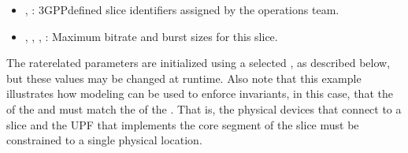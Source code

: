 \documentclass[a4paper,11pt,english]{sphinxmanual}
\begin{document}
\begin{itemize}
\item {} 
\sphinxAtStartPar
{}, : 3GPP\sphinxhyphen{}defined slice identifiers assigned by the operations team.

\item {} 
\sphinxAtStartPar
{}, , ,
: Maximum bit\sphinxhyphen{}rate and burst sizes for
this slice.

\end{itemize}

\sphinxAtStartPar
The rate\sphinxhyphen{}related parameters are initialized using a selected
, as described below, but these values may be changed at
runtime. Also note that this example illustrates how modeling can be
used to enforce invariants, in this case, that the  of the 
and  must match the  of the . That is, the
physical devices that connect to a slice and the UPF that implements
the core segment of the slice must be constrained to a single physical
location.
\end{document}
